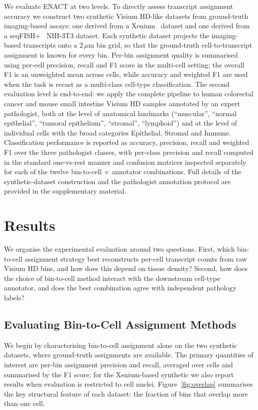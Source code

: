 \documentclass[11pt]{article}
\begin{document}
We evaluate ENACT at two levels. To directly assess transcript assignment accuracy we construct two synthetic Visium HD-like datasets from ground-truth imaging-based assays: one derived from a Xenium~\cite{janesick2023xenium,rao2021xenium} dataset and one derived from a seqFISH+~\cite{eng2019transcriptome} NIH-3T3 dataset. Each synthetic dataset projects the imaging-based transcripts onto a $2\,\mu\mathrm{m}$ bin grid, so that the ground-truth cell-to-transcript assignment is known for every bin. Per-bin assignment quality is summarised using per-cell precision, recall and F1 score in the multi-cell setting; the overall F1 is an unweighted mean across cells, while accuracy and weighted F1 are used when the task is recast as a multi-class cell-type classification. The second evaluation level is end-to-end: we apply the complete pipeline to human colorectal cancer and mouse small intestine Visium HD samples annotated by an expert pathologist, both at the level of anatomical landmarks (``muscular'', ``normal epithelial'', ``tumoral epithelium'', ``stromal'', ``lymphoid'') and at the level of individual cells with the broad categories Epithelial, Stromal and Immune. Classification performance is reported as accuracy, precision, recall and weighted F1 over the three pathologist classes, with per-class precision and recall computed in the standard one-vs-rest manner and confusion matrices inspected separately for each of the twelve bin-to-cell $\times$ annotator combinations. Full details of the synthetic-dataset construction and the pathologist annotation protocol are provided in the supplementary material.

\section{Results}

We organise the experimental evaluation around two questions. First, which bin-to-cell assignment strategy best reconstructs per-cell transcript counts from raw Visium HD bins, and how does this depend on tissue density? Second, how does the choice of bin-to-cell method interact with the downstream cell-type annotator, and does the best combination agree with independent pathology labels?

\subsection{Evaluating Bin-to-Cell Assignment Methods}

We begin by characterising bin-to-cell assignment alone on the two synthetic datasets, where ground-truth assignments are available. The primary quantities of interest are per-bin assignment precision and recall, averaged over cells and summarised by the F1 score; for the Xenium-based synthetic we also report results when evaluation is restricted to cell nuclei. Figure~\ref{fig:overlap} summarises the key structural feature of each dataset: the fraction of bins that overlap more than one cell.
\end{document}
